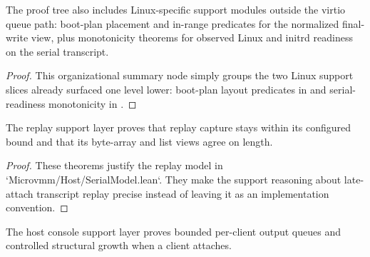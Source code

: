 \begin{theorem}
\label{thm:linux-boot-console-support}
\leanok
The proof tree also includes Linux-specific support modules outside the virtio queue path: boot-plan placement and in-range predicates for the normalized final-write view, plus monotonicity theorems for observed Linux and initrd readiness on the serial transcript.
\end{theorem}

\begin{proof}
\leanok
{}
This organizational summary node simply groups the two Linux support slices already surfaced one level lower: boot-plan layout predicates in  and serial-readiness monotonicity in .
\end{proof}

\begin{theorem}
\label{thm:serial-replay-bounds}
\leanok
The replay support layer proves that replay capture stays within its configured bound and that its byte-array and list views agree on length.
\end{theorem}

\begin{proof}
\leanok
These theorems justify the replay model in `Microvmm/Host/SerialModel.lean`.
They make the support reasoning about late-attach transcript replay precise instead of leaving it as an implementation convention.
\end{proof}

\begin{theorem}
\label{thm:host-console-bounds}
\leanok
The host console support layer proves bounded per-client output queues and controlled structural growth when a client attaches.
\end{theorem}

